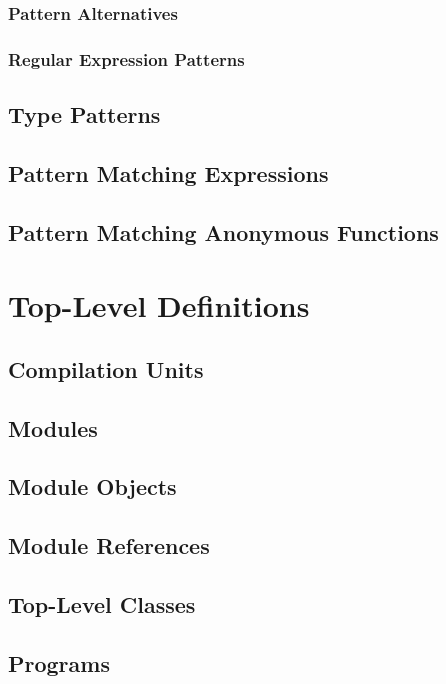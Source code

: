 \subsection{Pattern Alternatives}

\subsection{Regular Expression Patterns}

\section{Type Patterns}

\section{Pattern Matching Expressions}

\section{Pattern Matching Anonymous Functions}

\chapter{Top-Level Definitions}

\section{Compilation Units}

\section{Modules}

\section{Module Objects}

\section{Module References}

\section{Top-Level Classes}

\section{Programs}

